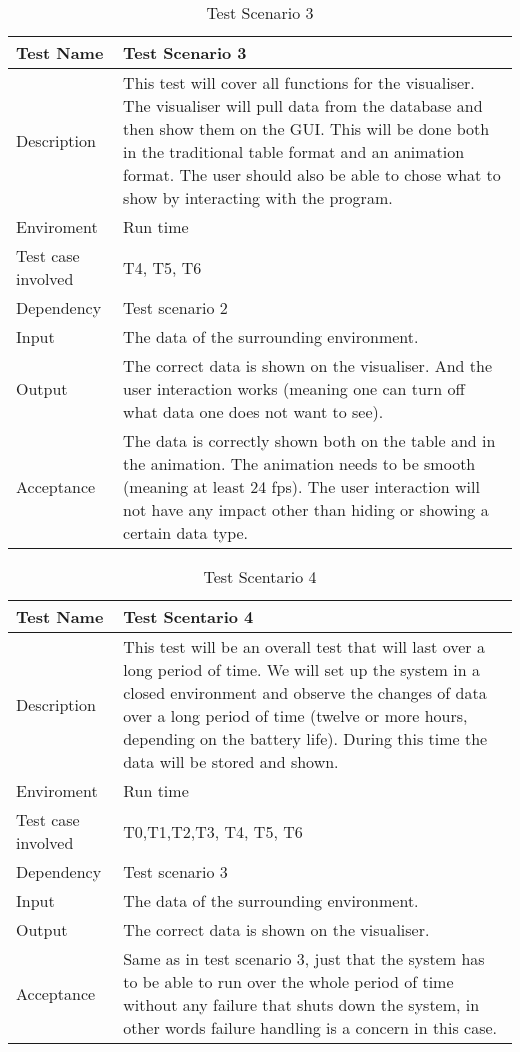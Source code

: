 \documentclass[../document]{subfiles}
\begin{document}
\begin{table}[H]
\caption{Test Scenario 3}
\centering
\begin{tabularx}{\textwidth}{|l|X|}
	\hline
	Test Name
	&Test Scenario 3
	\\ \hline Description
	&This test will cover all functions for the visualiser. The visualiser will pull data from the database and then show them on the GUI. This will be done both in the traditional table format and an animation format. The user should also be able to chose what to show by interacting with the program.
	\\ \hline Enviroment
	&Run time
	\\ \hline Test case involved
	&T4, T5, T6
	\\ \hline Dependency
	&Test scenario 2
	\\ \hline Input
	&The data of the surrounding environment.
	\\ \hline Output
	&The correct data is shown on the visualiser. And the user interaction works (meaning one can turn off what data one does not want to see).
	\\ \hline Acceptance
	&The data is correctly shown both on the table and in the animation. The animation needs to be smooth (meaning at least 24 fps). The user interaction will not have any impact other than hiding or showing a certain data type.
	\\ \hline 
\end{tabularx}
\end{table}

\begin{table}[H]
\caption{Test Scentario 4}
\centering
\begin{tabularx}{\textwidth}{|l|X|}
	\hline
	Test Name
	&Test Scentario 4
	\\ \hline Description
	&This test will be an overall test that will last over a long period of time. We will set up the system in a closed environment and observe the changes of data over a long period of time (twelve or more hours, depending on the battery life). During this time the data will be stored and shown.
	\\ \hline Enviroment
	&Run time
	\\ \hline Test case involved
	&T0,T1,T2,T3, T4, T5, T6
	\\ \hline Dependency
	&Test scenario 3
	\\ \hline Input
	&The data of the surrounding environment.
	\\ \hline Output
	&The correct data is shown on the visualiser.
	\\ \hline Acceptance
	&Same as in test scenario 3, just that the system has to be able to run over the whole period of time without any failure that shuts down the system, in other words failure handling is a concern in this case.
	\\ \hline 
\end{tabularx}
\end{table}
\end{document}

